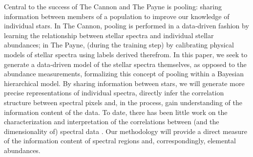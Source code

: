 \documentclass[a4paper,fleqn,usenatbib]{mnras}
\begin{document}
Central to the success of The Cannon and The Payne is pooling: sharing information between members of a population to improve our knowledge of individual stars. In The Cannon, pooling is performed in a data-driven fashion by learning the relationship between stellar spectra and individual stellar abundances; in The Payne, (during the training step) by calibrating physical models of stellar spectra using labels derived therefrom. In this paper, we seek to generate a data-driven model of the stellar spectra themselves, as opposed to the abundance measurements, formalizing this concept of pooling within a Bayesian hierarchical model. By sharing information between stars, we will generate more precise representations of individual spectra, directly infer the correlation structure between spectral pixels and, in the process, gain understanding of the information content of the data. To date, there has been little work on the characterization and interpretation of the correlations between (and the dimensionality of) spectral data \citep[see however][]{Ting2012, PJ2019, M2014}. Our methodology will provide a direct measure of the information content of spectral regions and, correspondingly, elemental abundances.


\end{document}
